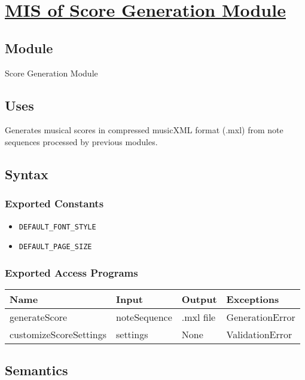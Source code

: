 \documentclass[12pt, titlepage]{article}
\begin{document}
\section{\hyperref[mSG]{MIS of Score Generation Module}} \label{M3}  

\subsection{Module}  
Score Generation Module  

\subsection{Uses}  
Generates musical scores in compressed musicXML format (.mxl) from note sequences processed by previous modules.  

\subsection{Syntax}  

\subsubsection{Exported Constants}  
\begin{itemize}
    \item \texttt{DEFAULT\_FONT\_STYLE}  
    \item \texttt{DEFAULT\_PAGE\_SIZE}  
\end{itemize}  

\subsubsection{Exported Access Programs}  
\begin{center}  
\begin{tabular}{|p{5cm}|p{4cm}|p{2cm}|p{3cm}|}  
\hline  
\textbf{Name} & \textbf{Input} & \textbf{Output} & \textbf{Exceptions} \\  
\hline  
generateScore & noteSequence & .mxl file & GenerationError \\  
customizeScoreSettings & settings & None & ValidationError \\  
\hline  
\end{tabular}  
\end{center}  

\subsection{Semantics}  
\end{document}
